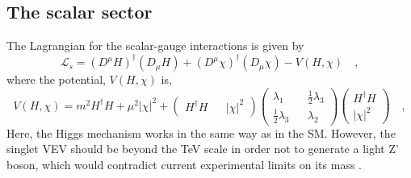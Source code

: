 \documentclass[12pt]{article}
\begin{document}
\subsection{The scalar sector}	

The Lagrangian for the scalar-gauge interactions is given by
%
\begin{equation}
\mathcal{L}_s = (D^\mu H)^\dagger (D_\mu H) + (D^\mu \chi)^\dagger (D_\mu \chi) - V(H,\chi) \quad , 
\end{equation}
% 
where the potential, $V(H,\chi)$ is,
%
\begin{equation}
 V(H,\chi) = m^2 H^\dagger H +  \mu^2 |\chi|^2 + \begin{pmatrix}
  H^\dagger H && |\chi|^2 \end{pmatrix}  \begin{pmatrix}   
  \lambda_1 && \frac{1}{2}   \lambda_3 \\
  \frac{1}{2}   \lambda_3   && \lambda_2
 \end{pmatrix} \begin{pmatrix}
   H^\dagger H \\ |\chi|^2 
 \end{pmatrix} \quad , 
 \label{potencial}
\end{equation}
%
Here, the Higgs mechanism works in the same way as in the SM. However, the singlet VEV should be beyond the TeV scale in order not to generate a light Z' boson, which would contradict current experimental limits on its mass \cite{Aaboud:2017buh}.
\end{document}
